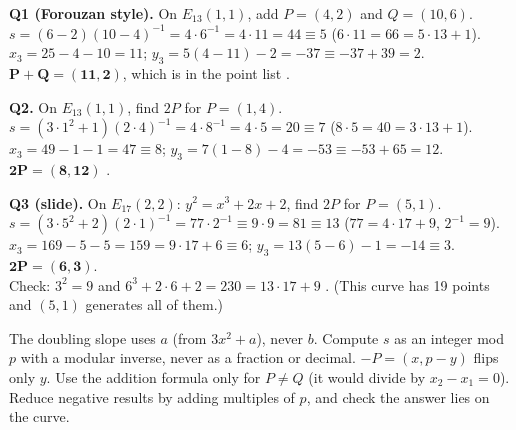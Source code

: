 \begin{worked}
\textbf{Q1 (Forouzan style).} On $E_{13}(1, 1)$, add $P = (4, 2)$ and $Q = (10, 6)$.\\
$s = (6 - 2)(10 - 4)^{-1} = 4 \cdot 6^{-1} = 4 \cdot 11 = 44 \equiv 5$ \;($6 \cdot 11 = 66 = 5 \cdot 13 + 1$).\\
$x_3 = 25 - 4 - 10 = 11$; \;$y_3 = 5(4 - 11) - 2 = -37 \equiv -37 + 39 = 2$. \;$\mathbf{P + Q = (11, 2)}$, which is in the point list \checkmark.

\textbf{Q2.} On $E_{13}(1, 1)$, find $2P$ for $P = (1, 4)$.\\
$s = (3 \cdot 1^2 + 1)(2 \cdot 4)^{-1} = 4 \cdot 8^{-1} = 4 \cdot 5 = 20 \equiv 7$ \;($8 \cdot 5 = 40 = 3 \cdot 13 + 1$).\\
$x_3 = 49 - 1 - 1 = 47 \equiv 8$; \;$y_3 = 7(1 - 8) - 4 = -53 \equiv -53 + 65 = 12$. \;$\mathbf{2P = (8, 12)}$ \checkmark.

\textbf{Q3 (slide).} On $E_{17}(2, 2)$: $y^2 = x^3 + 2x + 2$, find $2P$ for $P = (5, 1)$.\\
$s = (3 \cdot 5^2 + 2)(2 \cdot 1)^{-1} = 77 \cdot 2^{-1} \equiv 9 \cdot 9 = 81 \equiv 13$ \;($77 = 4 \cdot 17 + 9$, $2^{-1} = 9$).\\
$x_3 = 169 - 5 - 5 = 159 = 9 \cdot 17 + 6 \equiv 6$; \;$y_3 = 13(5 - 6) - 1 = -14 \equiv 3$. \;$\mathbf{2P = (6, 3)}$.\\
Check: $3^2 = 9$ and $6^3 + 2 \cdot 6 + 2 = 230 = 13 \cdot 17 + 9$ \checkmark. (This curve has 19 points and $(5, 1)$ generates all of them.)
\end{worked}

\begin{trap}
The doubling slope uses $a$ (from $3x^2 + a$), never $b$. Compute $s$ as an integer mod $p$ with a modular inverse, never as a fraction or decimal. $-P = (x, p - y)$ flips only $y$. Use the addition formula only for $P \ne Q$ (it would divide by $x_2 - x_1 = 0$). Reduce negative results by adding multiples of $p$, and check the answer lies on the curve.
\end{trap}

